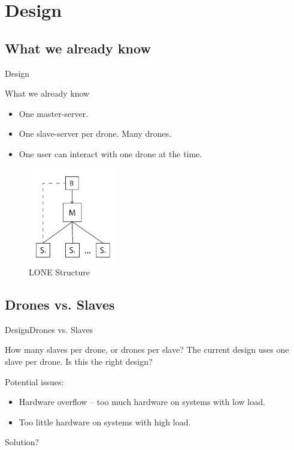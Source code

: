 
\author{Anders Eiler}
\section{Design}
\subsection{What we already know}
\begin{frame}{Design}
  \begin{block}{What we already know}
  \begin{itemize}
  	\item One master-server.
  	\item One slave-server per drone. Many drones. 
  	\item One user can interact with one drone at the time.
  \end{itemize}

  \begin{figure}[htb]
    \centering
    \includegraphics[width=0.35\textwidth]{gfx/slave_structure.pdf}
    \caption{LONE Structure}
  \end{figure}

  \end{block}
\end{frame}


\subsection{Drones vs. Slaves}
\begin{frame}{Design}{Drones vs. Slaves}
  \begin{block}{How many slaves per drone, or drones per slave?}
	The current design uses one slave per drone. Is this the right design?

	Potential issues:
	\begin{itemize}
		\item Hardware overflow -- too much hardware on systems with low load.
		\item Too little hardware on systems with high load.
	\end{itemize}

	Solution?
  \end{block}
\end{frame}


